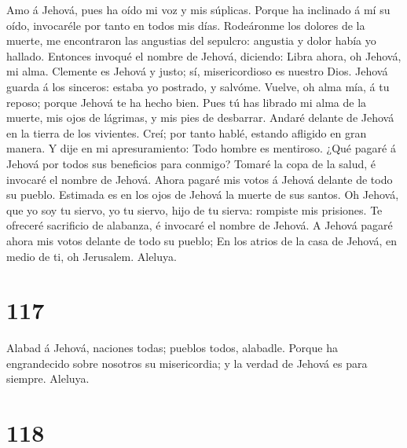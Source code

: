  Amo á Jehová, pues ha oído mi voz y mis súplicas.
 Porque ha inclinado á mí su oído, invocaréle por tanto en
todos mis días.  Rodeáronme los dolores de la muerte, me
encontraron las angustias del sepulcro: angustia y dolor había yo
hallado.  Entonces invoqué el nombre de Jehová, diciendo:
Libra ahora, oh Jehová, mi alma.  Clemente es Jehová y
justo; sí, misericordioso es nuestro Dios.  Jehová guarda
á los sinceros: estaba yo postrado, y salvóme.  Vuelve, oh
alma mía, á tu reposo; porque Jehová te ha hecho bien. 
Pues tú has librado mi alma de la muerte, mis ojos de lágrimas, y mis
pies de desbarrar.  Andaré delante de Jehová en la tierra
de los vivientes.  Creí; por tanto hablé, estando
afligido en gran manera.  Y dije en mi apresuramiento:
Todo hombre es mentiroso.  ¿Qué pagaré á Jehová por todos
sus beneficios para conmigo?  Tomaré la copa de la salud,
é invocaré el nombre de Jehová.  Ahora pagaré mis votos á
Jehová delante de todo su pueblo.  Estimada es en los
ojos de Jehová la muerte de sus santos.  Oh Jehová, que
yo soy tu siervo, yo tu siervo, hijo de tu sierva: rompiste mis
prisiones.  Te ofreceré sacrificio de alabanza, é
invocaré el nombre de Jehová.  A Jehová pagaré ahora mis
votos delante de todo su pueblo;  En los atrios de la
casa de Jehová, en medio de ti, oh Jerusalem. Aleluya.

\hypertarget{section-116}{%
\section{117}\label{section-116}}

 Alabad á Jehová, naciones todas; pueblos todos, alabadle.
 Porque ha engrandecido sobre nosotros su misericordia; y
la verdad de Jehová es para siempre. Aleluya.

\hypertarget{section-117}{%
\section{118}\label{section-117}}

